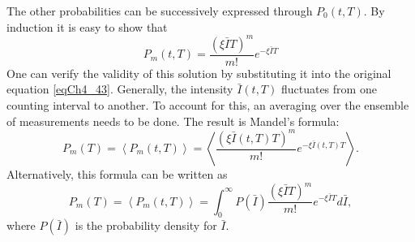 The other probabilities can be successively expressed through $P_0\left(t, T\right)$. By induction it is easy to show that
\begin{equation}
P_m\left(t, T\right) = \frac{\left(\xi \bar{I} T\right)^m}{m!} e^{-
  \xi \bar{I} T} 
\label{eqCh4_47}
\end{equation}
One can verify the validity of this solution by substituting it into the original equation \eqref{eqCh4_43}. Generally, the intensity $\bar{I}\left(t, T\right)$ fluctuates from one counting interval to another. To account for this, an averaging over the ensemble of measurements needs to be done. The result is Mandel's formula:
\begin{equation}
P_m\left(T\right) = 
\left<P_m\left(t, T\right)\right> = 
\left<
\frac{\left(\xi \bar{I}\left(t, T\right) T\right)^m}{m!} e^{-
  \xi \bar{I}\left(t, T\right) T} 
\right>.
\label{eqCh4_48}
\end{equation}
Alternatively, this formula can be written as
\begin{equation}
P_m\left(T\right) = 
\left<P_m\left(t, T\right)\right> = 
\int_0^{\infty}
P\left(\bar{I}\right)
\frac{\left(\xi \bar{I}T\right)^m}{m!} e^{-
  \xi \bar{I} T} 
d \bar{I},
\label{eqCh4_49}
\end{equation}
where $P\left(\bar{I}\right)$ is the probability density for $\bar{I}$.